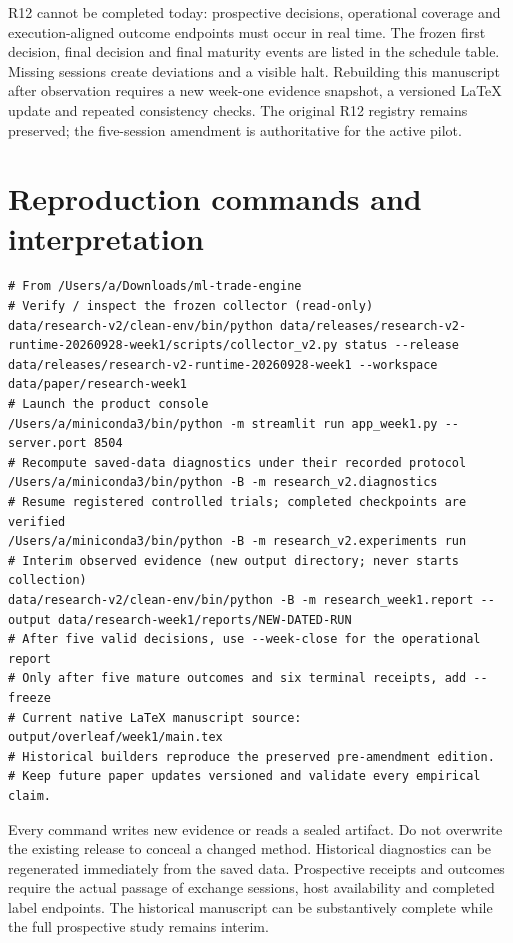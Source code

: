 \documentclass[11pt,a4paper]{article}
\begin{document}


R12 cannot be completed today: prospective decisions, operational coverage and execution-aligned outcome endpoints must occur in real time. The frozen first decision, final decision and final maturity events are listed in the schedule table. Missing sessions create deviations and a visible halt. Rebuilding this manuscript after observation requires a new week-one evidence snapshot, a versioned LaTeX update and repeated consistency checks. The original R12 registry remains preserved; the five-session amendment is authoritative for the active pilot.


\clearpage

\section{Reproduction commands and interpretation}\label{sec:appendix-c}

\begin{Verbatim}[breaklines=true,breakanywhere=true,fontsize=\scriptsize]
# From /Users/a/Downloads/ml-trade-engine
# Verify / inspect the frozen collector (read-only)
data/research-v2/clean-env/bin/python data/releases/research-v2-runtime-20260928-week1/scripts/collector_v2.py status --release data/releases/research-v2-runtime-20260928-week1 --workspace data/paper/research-week1
# Launch the product console
/Users/a/miniconda3/bin/python -m streamlit run app_week1.py --server.port 8504
# Recompute saved-data diagnostics under their recorded protocol
/Users/a/miniconda3/bin/python -B -m research_v2.diagnostics
# Resume registered controlled trials; completed checkpoints are verified
/Users/a/miniconda3/bin/python -B -m research_v2.experiments run
# Interim observed evidence (new output directory; never starts collection)
data/research-v2/clean-env/bin/python -B -m research_week1.report --output data/research-week1/reports/NEW-DATED-RUN
# After five valid decisions, use --week-close for the operational report
# Only after five mature outcomes and six terminal receipts, add --freeze
# Current native LaTeX manuscript source: output/overleaf/week1/main.tex
# Historical builders reproduce the preserved pre-amendment edition.
# Keep future paper updates versioned and validate every empirical claim.
\end{Verbatim}

Every command writes new evidence or reads a sealed artifact. Do not overwrite the existing release to conceal a changed method. Historical diagnostics can be regenerated immediately from the saved data. Prospective receipts and outcomes require the actual passage of exchange sessions, host availability and completed label endpoints. The historical manuscript can be substantively complete while the full prospective study remains interim.

\end{document}

